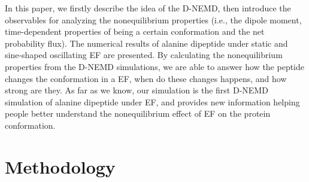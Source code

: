 \documentclass[a4paper,preprint,unsortedaddress,onecolumn]{revtex4-1}
\begin{document}
In this paper, we firstly describe the idea of the D-NEMD, then
introduce the
observables for analyzing the nonequilibrium properties
(i.e., the dipole moment, time-dependent properties of being a certain
conformation and the net
probability flux). The numerical results of alanine
dipeptide under static and sine-shaped oscillating EF are
presented. By calculating the nonequilibrium properties from the D-NEMD
simulations, we are able to answer how the peptide
changes the conformation in a EF, when do these changes happens,
and how strong are they.
As far as we know, our simulation is the first D-NEMD simulation
of alanine dipeptide under EF, and provides new
information helping people better understand the nonequilibrium
effect of EF on the protein conformation.



\section{Methodology}
\end{document}
